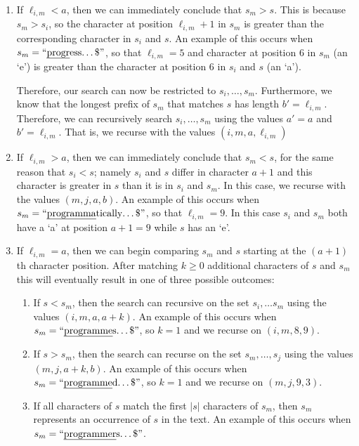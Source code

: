 \begin{enumerate}
\item If $\ell_{i,m}< a$, then we can immediately conclude that $s_m > s$. This is because $s_m > s_i$, so the character at position 
$\ell_{i,m}+1$ in $s_m$ is greater than the corresponding character in $s_i$ and $s$.  An example of this occurs when $s_m=\text{``\uline{progr}ess\ldots\$''}$, so that $\ell_{i,m}=5$ and character at position 6 in $s_m$ (an `e') is greater than the character at position 6 in $s_i$ and $s$ (an `a').

Therefore, our search can now be restricted to $s_i,\ldots,s_{m}$.  Furthermore, we know that the longest prefix of $s_m$ that matches $s$ has length $b'=\ell_{i,m}$.  Therefore, we can recursively search $s_i,\ldots,s_{m}$ using the values $a'=a$ and $b'=\ell_{i,m}$. That is, we recurse with the values $(i,m,a,\ell_{i,m})$

\item If $\ell_{i,m} > a$, then we can immediately conclude that $s_m < s$, for the same reason that $s_i < s$; namely $s_i$ and $s$ differ in character $a+1$ and this character is greater in $s$ than it is in $s_i$ and $s_m$.
In this case, we recurse with the values $(m,j,a, b)$.
An example of this occurs when $s_m=\text{``\uline{programma}tically\ldots\$''}$, so that $\ell_{i,m}=9$. In this case $s_i$ and $s_m$ both have a `a' at position $a+1=9$ while $s$ has an `e'.

\item If $\ell_{i,m}= a$, then we can begin comparing $s_m$ and $s$ starting at the $(a+1)$th character position. After matching $k\ge0$ additional characters of $s$ and $s_m$ this will eventually result in one of three possible outcomes:
\begin{enumerate}
  \item If $s < s_m$, then the search can recursive on the set $s_i,\ldots s_m$ using the values $(i,m,a,a+k)$.  An example of this occurs when $s_m=\text{``\uline{programme}s\ldots\$''}$, so $k=1$ and we recurse on $(i,m,8,9)$.

  \item If $s > s_m$, then the search can recurse on the set $s_m,\ldots,s_j$ using the values $(m,j,a+k, b)$.  An example of this occurs when $s_m=\text{``\uline{programme}d\ldots\$''}$, so $k=1$ and we recurse on $(m,j,9,3)$.

  \item If all characters of $s$ match the first $|s|$ characters of $s_m$, then $s_m$ represents an occurrence of $s$ in the text.
  An example of this occurs when $s_m=\text{``\uline{programmer}s\ldots\$''}$.
\end{enumerate}
\end{enumerate}

